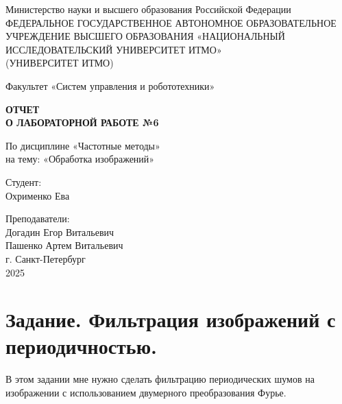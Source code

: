 \documentclass[a4paper,12pt]{article}
\begin{document}
	\begin{titlepage}
		\centering
		\vspace*{1cm}
		
		{\large Министерство науки и высшего образования Российской Федерации}\\
		{\large ФЕДЕРАЛЬНОЕ ГОСУДАРСТВЕННОЕ АВТОНОМНОЕ ОБРАЗОВАТЕЛЬНОЕ УЧРЕЖДЕНИЕ ВЫСШЕГО ОБРАЗОВАНИЯ «НАЦИОНАЛЬНЫЙ ИССЛЕДОВАТЕЛЬСКИЙ УНИВЕРСИТЕТ ИТМО»}\\
		{\large (УНИВЕРСИТЕТ ИТМО)}\\
		
		\vspace{2cm}
		
		{\large Факультет «Систем управления и робототехники»}\\
		
		\vspace{3cm}
		
		\textbf{{\Huge ОТЧЕТ}\\
			{\Huge О ЛАБОРАТОРНОЙ РАБОТЕ №6}}\\
		
		\vspace{1cm}
		
		{\LARGE По дисциплине «Частотные методы»}\\
		{\LARGE на тему: «Обработка изображений»}\\
		
		\vspace{3cm}
		
		{\Large Студент:}\\
		Охрименко Ева
		
		\vspace{2cm}
		
		{\Large Преподаватели:}\\
		Догадин Егор Витальевич\\
		Пашенко Артем Витальевич\\
		
		\vspace{3cm}
		{\large г. Санкт-Петербург}\\
		{\large 2025}
		
	\end{titlepage}
	\newpage
	\tableofcontents
	\newpage
	
\section{Задание.  Фильтрация изображений с периодичностью.}

В этом задании мне нужно сделать фильтрацию периодических шумов на изображении с использованием двумерного преобразования Фурье.\\	
\end{document}
